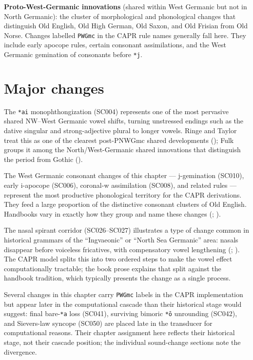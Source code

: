 \documentclass[
  british,
  a4paper,
  openany]{book}
\begin{document}
\textbf{Proto-West-Germanic innovations} (shared within West Germanic
but not in North Germanic): the cluster of morphological and
phonological changes that distinguish Old English, Old High German, Old
Saxon, and Old Frisian from Old Norse. Changes labelled \texttt{PWGmc}
in the CAPR rule names generally fall here. They include early apocope
rules, certain consonant assimilations, and the West Germanic gemination
of consonants before \texttt{*j}.

\section{Major changes}\label{major-changes}

The \texttt{*ai} monophthongization (SC004) represents one of the most
pervasive shared NW--West Germanic vowel shifts, turning unstressed
endings such as the dative singular and strong-adjective plural to
longer vowels. Ringe and Taylor treat this as one of the clearest
post-PNWGmc shared developments (); Fulk groups it among the North/West-Germanic
shared innovations that distinguish the period from Gothic
().

The West Germanic consonant changes of this chapter --- j-gemination
(SC010), early i-apocope (SC006), coronal-w assimilation (SC008), and
related rules --- represent the most productive phonological territory
for the CAPR derivations. They feed a large proportion of the
distinctive consonant clusters of Old English. Handbooks vary in exactly
how they group and name these changes
(;
).

The nasal spirant corridor (SC026--SC027) illustrates a type of change
common in historical grammars of the ``Ingvaeonic'' or ``North Sea
Germanic'' area: nasals disappear before voiceless fricatives, with
compensatory vowel lengthening (; ).
The CAPR model splits this into two ordered steps to make the vowel
effect computationally tractable; the book prose explains that split
against the handbook tradition, which typically presents the change as a
single process.

Several changes in this chapter carry \texttt{PWGmc} labels in the CAPR
implementation but appear later in the computational cascade than their
historical stage would suggest: final bare-\texttt{*a} loss (SC041),
surviving bimoric \texttt{*ō} unrounding (SC042), and Sievers-law
syncope (SC050) are placed late in the transducer for computational
reasons. Their chapter assignment here reflects their historical stage,
not their cascade position; the individual sound-change sections note
the divergence.
\end{document}
